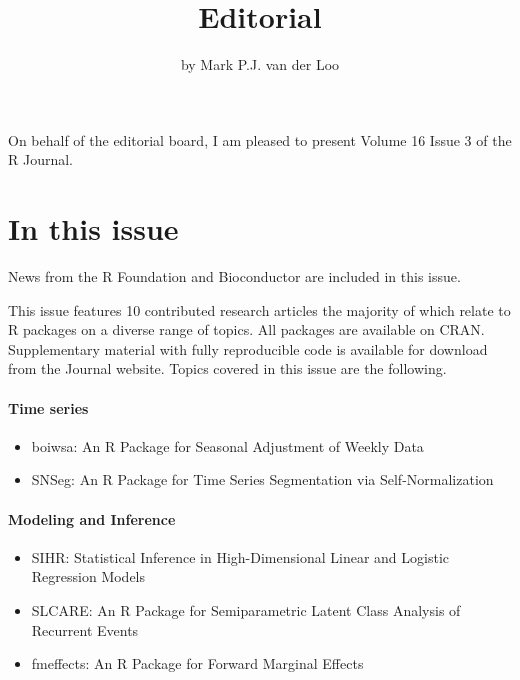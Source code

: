 \title{Editorial}


\author{by Mark P.J. van der Loo}

\maketitle


On behalf of the editorial board, I am pleased to present Volume 16 Issue 3 of
the R Journal.

\hypertarget{in-this-issue}{%
\section*{In this issue}\label{in-this-issue}}

News from the R Foundation and Bioconductor are included in this issue.

\noindent This issue features 10 contributed research articles the majority of
which relate to R packages on a diverse range of topics. All packages are
available on CRAN. Supplementary material with fully reproducible code is
available for download from the Journal website. Topics covered in this issue
are the following.

\hypertarget{time-series}{%
\paragraph{Time series}\label{time-series}}

\begin{itemize}
\tightlist
\item
  boiwsa: An R Package for Seasonal Adjustment of Weekly Data
\item
  SNSeg: An R Package for Time Series Segmentation via Self-Normalization
\end{itemize}

\hypertarget{modeling-and-inference}{%
\paragraph{Modeling and Inference}\label{modeling-and-inference}}

\begin{itemize}
\tightlist
\item
  SIHR: Statistical Inference in High-Dimensional Linear and Logistic Regression Models
\item
  SLCARE: An R Package for Semiparametric Latent Class Analysis of Recurrent Events
\item
  fmeffects: An R Package for Forward Marginal Effects
\end{itemize}

